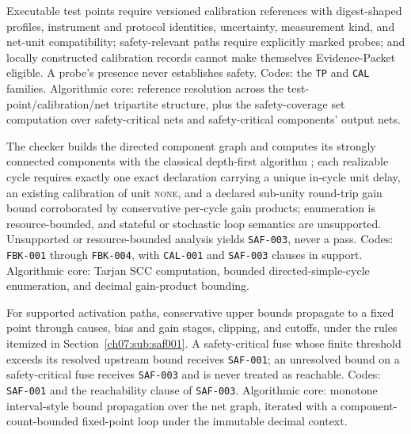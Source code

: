 \begin{checkclass}\label{ch07:cc:cal}
Executable test points require versioned calibration references with digest-shaped profiles, instrument and protocol identities, uncertainty, measurement kind, and net-unit compatibility; safety-relevant paths require explicitly marked probes; and locally constructed calibration records cannot make themselves Evidence-Packet eligible. A probe's presence never establishes safety. Codes: the \texttt{TP} and \texttt{CAL} families. Algorithmic core: reference resolution across the test-point/calibration/net tripartite structure, plus the safety-coverage set computation over safety-critical nets and safety-critical components' output nets.
\end{checkclass}

\begin{checkclass}\label{ch07:cc:fbk}
The checker builds the directed component graph and computes its strongly connected components with the classical depth-first algorithm \cite{tarjan}; each realizable cycle requires exactly one exact declaration carrying a unique in-cycle unit delay, an existing calibration of unit \textsc{none}, and a declared sub-unity round-trip gain bound corroborated by conservative per-cycle gain products; enumeration is resource-bounded, and stateful or stochastic loop semantics are unsupported. Unsupported or resource-bounded analysis yields \texttt{SAF-003}, never a pass. Codes: \texttt{FBK-001} through \texttt{FBK-004}, with \texttt{CAL-001} and \texttt{SAF-003} clauses in support. Algorithmic core: Tarjan SCC computation, bounded directed-simple-cycle enumeration, and decimal gain-product bounding.
\end{checkclass}

\begin{checkclass}\label{ch07:cc:reach}
For supported activation paths, conservative upper bounds propagate to a fixed point through causes, bias and gain stages, clipping, and cutoffs, under the rules itemized in Section~\ref{ch07:sub:saf001}. A safety-critical fuse whose finite threshold exceeds its resolved upstream bound receives \texttt{SAF-001}; an unresolved bound on a safety-critical fuse receives \texttt{SAF-003} and is never treated as reachable. Codes: \texttt{SAF-001} and the reachability clause of \texttt{SAF-003}. Algorithmic core: monotone interval-style bound propagation over the net graph, iterated with a component-count-bounded fixed-point loop under the immutable decimal context.
\end{checkclass}

